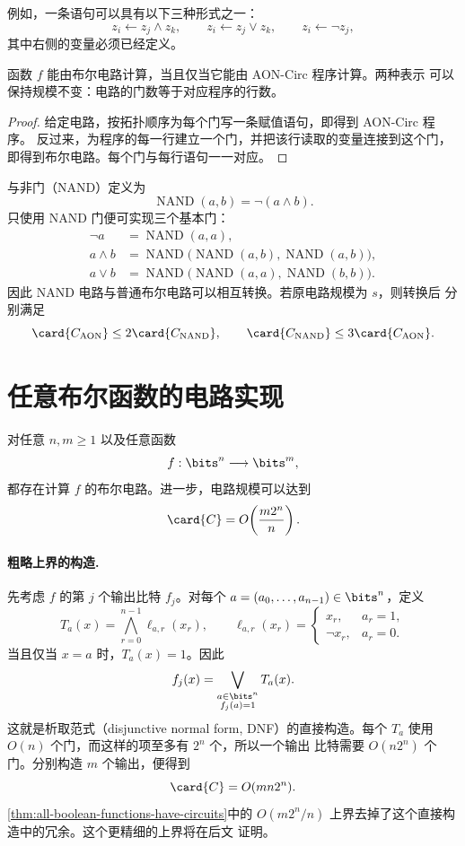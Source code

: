 例如，一条语句可以具有以下三种形式之一：
\[
  z_i\gets z_j\land z_k,
  \qquad
  z_i\gets z_j\lor z_k,
  \qquad
  z_i\gets\neg z_j,
\]
其中右侧的变量必须已经定义。

\begin{theorem}
  \label{thm:circuit-program-equivalence}
  函数 $f$ 能由布尔电路计算，当且仅当它能由 AON-Circ 程序计算。两种表示
  可以保持规模不变：电路的门数等于对应程序的行数。
\end{theorem}

\begin{proof}
  给定电路，按拓扑顺序为每个门写一条赋值语句，即得到 AON-Circ 程序。
  反过来，为程序的每一行建立一个门，并把该行读取的变量连接到这个门，
  即得到布尔电路。每个门与每行语句一一对应。
\end{proof}

与非门（NAND）定义为
\[
  \operatorname{NAND}(a,b)=\neg(a\land b).
\]
只使用 NAND 门便可实现三个基本门：
\begin{align*}
  \neg a
    &=\operatorname{NAND}(a,a),\\
  a\land b
    &=\operatorname{NAND}\bigl(
        \operatorname{NAND}(a,b),
        \operatorname{NAND}(a,b)
      \bigr),\\
  a\lor b
    &=\operatorname{NAND}\bigl(
        \operatorname{NAND}(a,a),
        \operatorname{NAND}(b,b)
      \bigr).
\end{align*}
因此 NAND 电路与普通布尔电路可以相互转换。若原电路规模为 $s$，则转换后
分别满足
\[
  \card{C_{\mathrm{AON}}}\leq 2\card{C_{\mathrm{NAND}}},
  \qquad
  \card{C_{\mathrm{NAND}}}\leq 3\card{C_{\mathrm{AON}}}.
\]

\section{任意布尔函数的电路实现}

\begin{theorem}
  \label{thm:all-boolean-functions-have-circuits}
  对任意 $n,m\geq 1$ 以及任意函数
  \[
    f:\bits^n\longrightarrow\bits^m,
  \]
  都存在计算 $f$ 的布尔电路。进一步，电路规模可以达到
  \[
    \card{C}=O\!\left(\frac{m2^n}{n}\right).
  \]
\end{theorem}

\paragraph{粗略上界的构造.}
先考虑 $f$ 的第 $j$ 个输出比特 $f_j$。对每个
$a=(a_0,\ldots,a_{n-1})\in\bits^n$，定义
\[
  T_a(x)=\bigwedge_{r=0}^{n-1}\ell_{a,r}(x_r),
  \qquad
  \ell_{a,r}(x_r)=
  \begin{cases}
    x_r, & a_r=1,\\
    \neg x_r, & a_r=0.
  \end{cases}
\]
当且仅当 $x=a$ 时，$T_a(x)=1$。因此
\[
  f_j(x)=\bigvee_{\substack{a\in\bits^n\\f_j(a)=1}}T_a(x).
\]
这就是析取范式（disjunctive normal form, DNF）的直接构造。每个 $T_a$
使用 $O(n)$ 个门，而这样的项至多有 $2^n$ 个，所以一个输出
比特需要 $O(n2^n)$ 个门。分别构造 $m$ 个输出，便得到
\[
  \card{C}=O(mn2^n).
\]
\cref{thm:all-boolean-functions-have-circuits}中的
$O(m2^n/n)$ 上界去掉了这个直接构造中的冗余。这个更精细的上界将在后文
证明。

